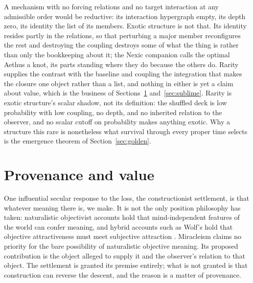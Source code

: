 A mechanism with no forcing relations and no target interaction at any
admissible order would be reductive: its interaction hypergraph empty, its
depth zero, its identity the list of its members. Exotic structure is not
that. Its identity resides partly in the relations, so that perturbing a major
member reconfigures the rest and destroying the coupling destroys some of what
the thing is rather than only the bookkeeping about it; the Nexic companion
calls the optimal Aethus a knot, its parts standing where they do because the
others do. Rarity supplies the contrast with the baseline and coupling the
integration that makes the closure one object rather than a list, and nothing
in either is yet a claim about value, which is the business of
Sections~\ref{sec:construction} and~\ref{sec:sublime}. Rarity is exotic
structure's scalar shadow, not its definition: the shuffled deck is low
probability with low coupling, no depth, and no inherited relation to the
observer, and no scalar cutoff on probability makes anything exotic.
Why a structure this rare is nonetheless what survival through every
proper time selects is the emergence theorem of
Section~\ref{sec:golden}.

\section{Provenance and value}\label{sec:construction}

One influential secular response to the loss, the constructionist settlement,
is that whatever meaning there is, we make. It is not the only position
philosophy has taken: naturalistic objectivist accounts hold that
mind-independent features of the world can confer meaning, and hybrid accounts
such as Wolf's hold that objective attractiveness must meet subjective
attraction \cite{Wolf10,MetzSEP}. Miracleism claims no priority for the bare
possibility of naturalistic objective meaning. Its proposed contribution is
the object alleged to supply it and the observer's relation to that object.
The settlement is granted its premise entirely; what is not granted is that
construction can reverse the descent, and the reason is a matter of
provenance.

